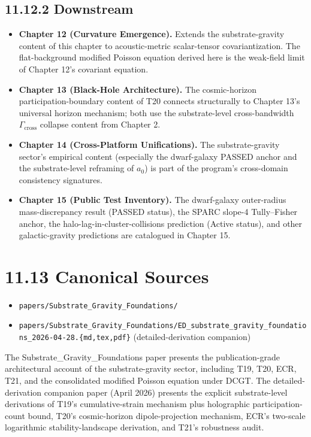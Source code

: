 \documentclass[11pt]{book}
\begin{document}
\subsection{11.12.2 Downstream}

\begin{itemize}
\item \textbf{Chapter 12 (Curvature Emergence).} Extends the substrate-gravity content of this chapter to acoustic-metric scalar-tensor covariantization. The flat-background modified Poisson equation derived here is the weak-field limit of Chapter 12's covariant equation.
\item \textbf{Chapter 13 (Black-Hole Architecture).} The cosmic-horizon participation-boundary content of T20 connects structurally to Chapter 13's universal horizon mechanism; both use the substrate-level cross-bandwidth $\Gamma_\mathrm{cross}$ collapse content from Chapter 2.
\item \textbf{Chapter 14 (Cross-Platform Unifications).} The substrate-gravity sector's empirical content (especially the dwarf-galaxy PASSED anchor and the substrate-level reframing of $a_0$) is part of the program's cross-domain consistency signatures.
\item \textbf{Chapter 15 (Public Test Inventory).} The dwarf-galaxy outer-radius mass-discrepancy result (PASSED status), the SPARC slope-4 Tully–Fisher anchor, the halo-lag-in-cluster-collisions prediction (Active status), and other galactic-gravity predictions are catalogued in Chapter 15.
\end{itemize}

\section{11.13 Canonical Sources}

\begin{itemize}
\item \texttt{papers/Substrate\_Gravity\_Foundations/}
\item \texttt{papers/Substrate\_Gravity\_Foundations/ED\_substrate\_gravity\_foundations\_2026-04-28.\{md,tex,pdf\}} (detailed-derivation companion)
\end{itemize}

The Substrate\_Gravity\_Foundations paper presents the publication-grade architectural account of the substrate-gravity sector, including T19, T20, ECR, T21, and the consolidated modified Poisson equation under DCGT. The detailed-derivation companion paper (April 2026) presents the explicit substrate-level derivations of T19's cumulative-strain mechanism plus holographic participation-count bound, T20's cosmic-horizon dipole-projection mechanism, ECR's two-scale logarithmic stability-landscape derivation, and T21's robustness audit.
\end{document}
